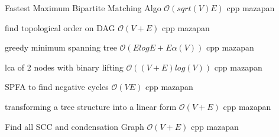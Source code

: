 {Fastest Maximum Bipartite Matching Algo}
{$\mathcal{O}(sqrt(V)E)$}
{cpp}{}
{mazapan}

{find topological order on DAG}
{$\mathcal{O}(V + E)$}
{cpp}{}
{mazapan}

{greedy minimum spanning tree}
{$\mathcal{O}(ElogE+Eα(V))$}
{cpp}{}
{mazapan}

{lca of 2 nodes with binary lifting}
{$\mathcal{O}((V + E)log(V))$}
{cpp}{}
{mazapan}

{SPFA to find negative cycles}
{$\mathcal{O}(VE)$}
{cpp}{}
{mazapan}

{transforming a tree structure into a linear form}
{$\mathcal{O}(V + E)$}
{cpp}{}
{mazapan}

{Find all SCC and condensation Graph}
{$\mathcal{O}(V + E)$}
{cpp}{}
{mazapan}